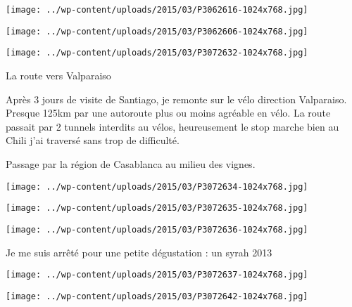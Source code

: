 \begin{center} \texttt{[image: ../wp-content/uploads/2015/03/P3062616-1024x768.jpg]} \end{center}

 

\begin{center} \texttt{[image: ../wp-content/uploads/2015/03/P3062606-1024x768.jpg]} \end{center}

 

\begin{center} \texttt{[image: ../wp-content/uploads/2015/03/P3072632-1024x768.jpg]} \end{center}

  La route vers Valparaiso 

 Après 3 jours de visite de Santiago, je remonte sur le vélo direction Valparaiso. Presque 125km par une autoroute plus ou moins agréable en vélo. La route passait par 2 tunnels interdits au vélos, heureusement le stop marche bien au Chili j'ai traversé sans trop de difficulté. 

 Passage par la région de Casablanca au milieu des vignes. 

\begin{center} \texttt{[image: ../wp-content/uploads/2015/03/P3072634-1024x768.jpg]} \end{center}

 

\begin{center} \texttt{[image: ../wp-content/uploads/2015/03/P3072635-1024x768.jpg]} \end{center}

 

\begin{center} \texttt{[image: ../wp-content/uploads/2015/03/P3072636-1024x768.jpg]} \end{center}

  Je me suis arrêté pour une petite dégustation : un syrah 2013

\begin{center} \texttt{[image: ../wp-content/uploads/2015/03/P3072637-1024x768.jpg]} \end{center}

 

\begin{center} \texttt{[image: ../wp-content/uploads/2015/03/P3072642-1024x768.jpg]} \end{center}

